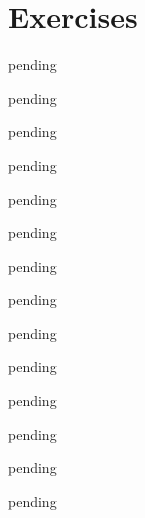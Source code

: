 \section{Exercises}

\begin{exercise} \label{E.1.1}
    pending
\end{exercise}

\begin{exercise} \label{E.1.2}
    pending
\end{exercise}

\begin{exercise} \label{E.1.3}
    pending
\end{exercise}

\begin{exercise} \label{E.1.4}
    pending
\end{exercise}

\begin{exercise} \label{E.1.5}
    pending
\end{exercise}

\begin{exercise} \label{E.1.6}
    pending
\end{exercise}

\begin{exercise} \label{E.1.7}
    pending
\end{exercise}

\begin{exercise} \label{E.1.8}
    pending
\end{exercise}

\begin{exercise} \label{E.1.9}
    pending
\end{exercise}

\begin{exercise} \label{E.1.10}
    pending
\end{exercise}

\begin{exercise} \label{E.1.11}
    pending
\end{exercise}

\begin{exercise} \label{E.1.12}
    pending
\end{exercise}

\begin{exercise} \label{E.1.13}
    pending
\end{exercise}

\begin{exercise} \label{E.1.14}
    pending
\end{exercise}

